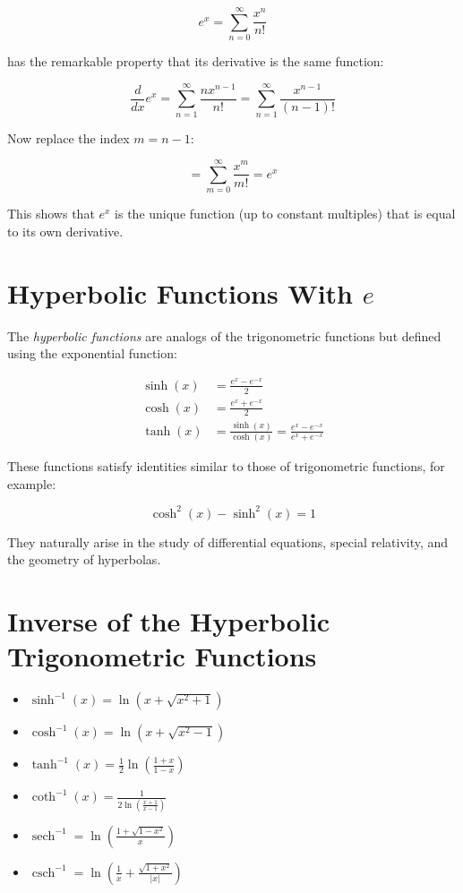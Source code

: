 \[
    e^x = \sum_{n=0}^{\infty} \frac{x^n}{n!}
\]

has the remarkable property that its derivative is the same function:

\[
    \frac{d}{dx} e^x = \sum_{n=1}^{\infty} \frac{n x^{n-1}}{n!} = \sum_{n=1}^{\infty} \frac{x^{n-1}}{(n-1)!}
\]

Now replace the index \(m = n - 1\):

\[
    = \sum_{m=0}^{\infty} \frac{x^m}{m!} = e^x
\]

This shows that \(e^x\) is the unique function (up to constant multiples) that is equal to its own 
derivative.

\section{Hyperbolic Functions With \texorpdfstring{\(e\)}{e}}

The \emph{hyperbolic functions} are analogs of the trigonometric functions but defined using the exponential 
function:

\begin{align*}
    \sinh(x) &= \frac{e^x - e^{-x}}{2} \\
    \cosh(x) &= \frac{e^x + e^{-x}}{2} \\
    \tanh(x) &= \frac{\sinh(x)}{\cosh(x)} = \frac{e^x - e^{-x}}{e^x + e^{-x}}
\end{align*}

These functions satisfy identities similar to those of trigonometric functions, for example:

\[
    \cosh^2(x) - \sinh^2(x) = 1
\]

They naturally arise in the study of differential equations, special relativity, and the 
geometry of hyperbolas.

\section{Inverse of the Hyperbolic Trigonometric Functions}

\begin{itemize}
    
    \item \(\sinh^{-1}(x) = \ln(x + \sqrt{x^2 + 1})\)
    
    \item \(\cosh^{-1}(x) = \ln(x + \sqrt{x^2 - 1})\)
    
    \item \(\tanh^{-1}(x) = \frac{1}{2} \ln\left(\frac{1 + x}{1 - x}\right)\)
    
    \item \(\coth^{-1}(x) = \frac{1}{2 \ln\left(\frac{x + 1}{x - 1}\right)}\)
    
    \item \(\operatorname{sech}^{-1} = \ln\left(\frac{1 + \sqrt{1 - x^2}}{x}\right)\)
    
    \item \(\operatorname{csch}^{-1} = \ln\left( \frac{1}{x} + \frac{\sqrt{1 + x^2}}{|x|}\right)\) 

\end{itemize}